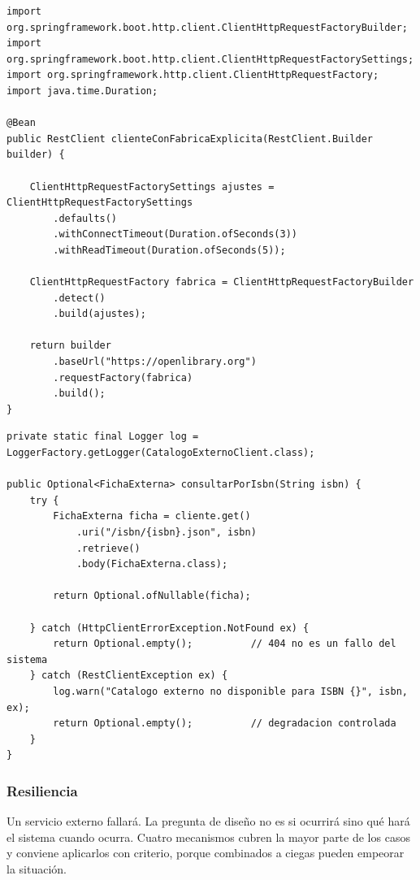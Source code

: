 \documentclass[11pt,a4paper,openany]{book}
\begin{document}
\begin{lstlisting}[style=java,caption={Alternativa programatica cuando se requiere una fabrica especifica.},label={lst:u4:restclient-prog}]
import org.springframework.boot.http.client.ClientHttpRequestFactoryBuilder;
import org.springframework.boot.http.client.ClientHttpRequestFactorySettings;
import org.springframework.http.client.ClientHttpRequestFactory;
import java.time.Duration;

@Bean
public RestClient clienteConFabricaExplicita(RestClient.Builder builder) {

	ClientHttpRequestFactorySettings ajustes = ClientHttpRequestFactorySettings
		.defaults()
		.withConnectTimeout(Duration.ofSeconds(3))
		.withReadTimeout(Duration.ofSeconds(5));

	ClientHttpRequestFactory fabrica = ClientHttpRequestFactoryBuilder
		.detect()
		.build(ajustes);

	return builder
		.baseUrl("https://openlibrary.org")
		.requestFactory(fabrica)
		.build();
}
\end{lstlisting}

\begin{lstlisting}[style=java,caption={Invocacion de un servicio externo con traduccion del error.},label={lst:u4:restclient-uso}]
private static final Logger log = LoggerFactory.getLogger(CatalogoExternoClient.class);

public Optional<FichaExterna> consultarPorIsbn(String isbn) {
	try {
		FichaExterna ficha = cliente.get()
			.uri("/isbn/{isbn}.json", isbn)
			.retrieve()
			.body(FichaExterna.class);

		return Optional.ofNullable(ficha);

	} catch (HttpClientErrorException.NotFound ex) {
		return Optional.empty();          // 404 no es un fallo del sistema
	} catch (RestClientException ex) {
		log.warn("Catalogo externo no disponible para ISBN {}", isbn, ex);
		return Optional.empty();          // degradacion controlada
	}
}
\end{lstlisting}

\subsubsection{Resiliencia}

Un servicio externo fallará. La pregunta de diseño no es si ocurrirá sino qué hará el sistema cuando ocurra. Cuatro mecanismos cubren la mayor parte de los casos y conviene aplicarlos con criterio, porque combinados a ciegas pueden empeorar la situación.
\end{document}
